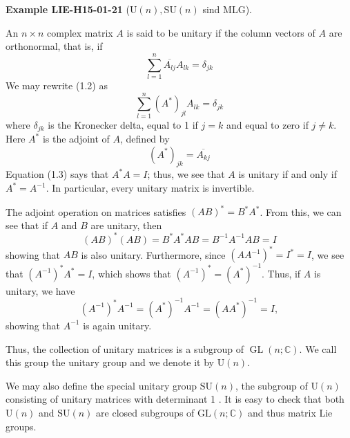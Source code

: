 \documentclass[10pt, letterpaper]{article}
\newcommand{\SU}{\mathrm{SU}}
\newcommand{\U}{\mathrm{U}}
\newcommand{\CustomHeading}[3]{%
  \par\medskip\noindent%
  \textbf{#1 #2} \textnormal{(#3)}.\enskip%
}
\newenvironment{EXA}[2]{\CustomHeading{Example}{#1}{#2}}{}
\begin{document}
\begin{EXA}{LIE-H15-01-21}{$\U(n), \SU(n)$ sind MLG}
An $n \times n$ complex matrix $A$ is said to be unitary if the column vectors of $A$ are orthonormal, that is, if
$$
\sum_{l=1}^{n} \overline{A_{l j}} A_{l k}=\delta_{j k}
$$
We may rewrite (1.2) as
$$
\sum_{l=1}^{n}\left(A^{*}\right)_{j l} A_{l k}=\delta_{j k}
$$
where $\delta_{j k}$ is the Kronecker delta, equal to 1 if $j=k$ and equal to zero if $j \neq k$. Here $A^{*}$ is the adjoint of $A$, defined by
$$
\left(A^{*}\right)_{j k}=\overline{A_{k j}}
$$
Equation (1.3) says that $A^{*} A=I$; thus, we see that $A$ is unitary if and only if $A^{*}=A^{-1}$. In particular, every unitary matrix is invertible.

The adjoint operation on matrices satisfies $(A B)^{*}=B^{*} A^{*}$. From this, we can see that if $A$ and $B$ are unitary, then
$$
(A B)^{*}(A B)=B^{*} A^{*} A B=B^{-1} A^{-1} A B=I
$$
showing that $A B$ is also unitary. Furthermore, since $\left(A A^{-1}\right)^{*}=I^{*}=I$, we see that $\left(A^{-1}\right)^{*} A^{*}=I$, which shows that $\left(A^{-1}\right)^{*}=\left(A^{*}\right)^{-1}$. Thus, if $A$ is unitary, we have
$$
\left(A^{-1}\right)^{*} A^{-1}=\left(A^{*}\right)^{-1} A^{-1}=\left(A A^{*}\right)^{-1}=I,
$$
showing that $A^{-1}$ is again unitary.

Thus, the collection of unitary matrices is a subgroup of $\operatorname{GL}(n ; \mathbb{C})$. We call this group the unitary group and we denote it by $\mathrm{U}(n)$. 


We may also define the special unitary group $\mathrm{SU}(n)$, the subgroup of $\mathrm{U}(n)$ consisting of unitary matrices with determinant 1 . It is easy to check that both $\mathrm{U}(n)$ and $\mathrm{SU}(n)$ are closed subgroups of $\mathrm{GL}(n ; \mathbb{C})$ and thus matrix Lie groups.
\end{EXA}
\end{document}
